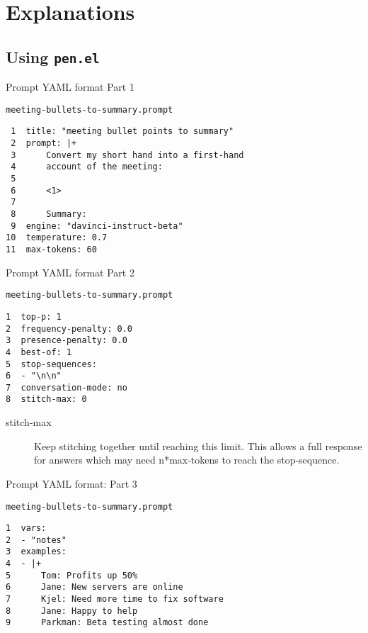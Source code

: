 \documentclass[presentation]{beamer}
\begin{document}
\section{Explanations}
\label{sec:orgd71c930}
\subsection{Using \texttt{pen.el}}
\label{sec:org1213b75}
\begin{frame}[label={sec:org3122d47},fragile]{Prompt YAML format Part 1}
 \begin{block}{\texttt{meeting-bullets-to-summary.prompt}}
\begin{verbatim}
 1  title: "meeting bullet points to summary"
 2  prompt: |+
 3      Convert my short hand into a first-hand
 4      account of the meeting:
 5  
 6      <1>
 7  
 8      Summary:
 9  engine: "davinci-instruct-beta"
10  temperature: 0.7
11  max-tokens: 60
\end{verbatim}
\end{block}
\end{frame}

\begin{frame}[label={sec:orgbaba773},fragile]{Prompt YAML format Part 2}
 \begin{block}{\texttt{meeting-bullets-to-summary.prompt}}
\begin{verbatim}
1  top-p: 1
2  frequency-penalty: 0.0
3  presence-penalty: 0.0
4  best-of: 1
5  stop-sequences:
6  - "\n\n"
7  conversation-mode: no
8  stitch-max: 0
\end{verbatim}

\begin{description}
\item[{stitch-max}] Keep stitching together until reaching this limit.
This allows a full response for answers which may need n*max-tokens to reach the stop-sequence.
\end{description}
\end{block}
\end{frame}

\begin{frame}[label={sec:orgcfbede6},fragile]{Prompt YAML format: Part 3}
 \begin{block}{\texttt{meeting-bullets-to-summary.prompt}}
\begin{verbatim}
1  vars:
2  - "notes"
3  examples:
4  - |+
5      Tom: Profits up 50%
6      Jane: New servers are online
7      Kjel: Need more time to fix software
8      Jane: Happy to help
9      Parkman: Beta testing almost done
\end{verbatim}
\end{block}
\end{frame}
\end{document}
